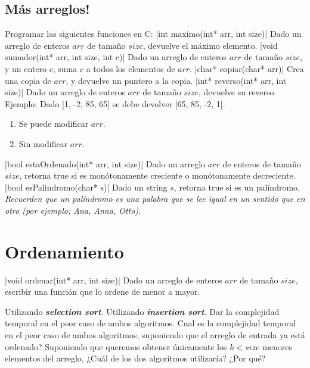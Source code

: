 \documentclass[titlepage,oneside]{book}
\begin{document}
\subsection{Más arreglos!}
\begin{Exercise} Programar las siguientes funciones en C:
	\Question {}|int maximo(int* arr, int size)|
        Dado un arreglo de enteros $arr$ de tamaño $size$, devuelve el máximo elemento.
	\Question {}|void sumador(int* arr, int size, int c)|
        Dado un arreglo de enteros $arr$ de tamaño $size$, y un entero $c$, suma $c$ a todos los elementos de $arr$.
	\Question {}|char* copiar(char* arr)|
        Crea una copia de $arr$, y devuelve un puntero a la copia.
	\Question {}|int* reverso(int* arr, int size)|
        Dado un arreglo de enteros $arr$ de tamaño $size$, devuelve su reverso. \newline
        Ejemplo: Dado [1, -2, 85, 65] se debe devolver [65, 85, -2, 1].
        \begin{enumerate}
            \item Se puede modificar $arr$.
            \item Sin modificar $arr$.
        \end{enumerate}
	\Question {}|bool estaOrdenado(int* arr, int size)|
        Dado un arreglo $arr$ de enteros de tamaño $size$, retorna true si es monótonamente creciente o monótonamente decreciente.
 	\Question {}|bool esPalindromo(char* s)|
        Dado un string $s$, retorna true si es un palíndromo. \textit{Recuerden que un palíndromo es una palabra que se lee igual en un sentido que en otro (por ejemplo; Ana, Anna, Otto).}
\end{Exercise}

\section{Ordenamiento}
\begin{Exercise}
	|void ordenar(int* arr, int size)|
    Dado un arreglo de enteros $arr$ de tamaño $size$, escribir una función que lo ordene de menor a mayor.

	\Question Utilizando \textbf{\textit{selection sort}}.
    \Question Utilizando \textbf{\textit{insertion sort}}.
    \Question Dar la complejidad temporal en el peor caso de ambos algoritmos.
    \Question Cual es la complejidad temporal en el peor caso de ambos algoritmos, suponiendo que el arreglo de entrada ya está ordenado?
    \Question Suponiendo que queremos obtener únicamente los $k < size$ menores elementos del arreglo, ¿Cuál de los dos algoritmos utilizaría? ¿Por qué?
\end{Exercise}
\end{document}
